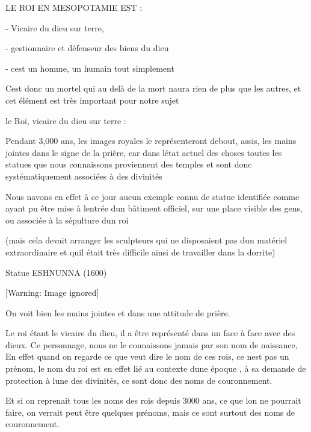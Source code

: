 \documentclass{article}
\begin{document}
LE ROI EN MESOPOTAMIE EST :

{}- Vicaire du dieu sur terre,

{}- gestionnaire et défenseur des biens du dieu 

{}- c{\textquotesingle}est un homme, un humain tout simplement

C{\textquotesingle}est donc un mortel qui au delà de la mort
n{\textquotesingle}aura rien de plus que les autres, et cet élément est
très important pour notre sujet

le Roi, vicaire du dieu sur terre :  

Pendant 3,000 ans, les images royales le représenteront debout, assis,
les mains jointes dans le signe de la prière, car dans
l{\textquotesingle}état actuel des choses toutes les statues que nous
connaissons proviennent des temples et sont donc systématiquement
associées à des divinités

Nous n{\textquotesingle}avons en effet à ce jour aucun exemple connu de
statue identifiée comme ayant pu être mise à l{\textquotesingle}entrée
d{\textquotesingle}un bâtiment officiel, sur une place visible des
gens, ou associée à la sépulture d{\textquotesingle}un roi

(mais cela devait arranger les sculpteurs qui ne disposaient pas
d{\textquotesingle}un matériel extraordinaire et qu{\textquotesingle}il
était très difficile ainsi de travailler dans la dorrite)

Statue ESHNUNNA (1600) 

  [Warning: Image ignored] %
 

On voit bien les mains jointes et dans une attitude de prière.

Le roi étant le vicaire du dieu, il a  être représenté dans un face à
face avec des dieux. Ce personnage, nous ne le connaissons jamais par
son nom de naissance,  En effet quand on regarde ce que veut dire le
nom de ces rois, ce n{\textquotesingle}est pas un prénom, le nom du roi
est en effet lié au contexte d{\textquotesingle}une époque , à sa
demande de protection à l{\textquotesingle}une des divinités, ce sont
donc des noms de couronnement.

Et si on reprenait tous les noms des rois depuis 3000 ans, ce que
l{\textquotesingle}on ne pourrait faire, on verrait peut être quelques
prénoms, mais ce sont surtout des noms de couronnement.
\end{document}
